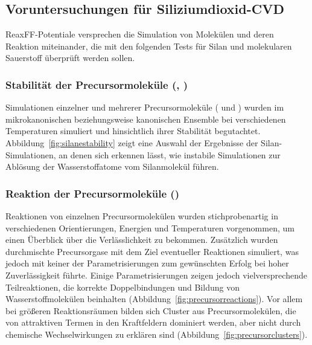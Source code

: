 \subsection{Voruntersuchungen für Siliziumdioxid-CVD}

ReaxFF-Potentiale versprechen die Simulation von Molekülen und deren Reaktion miteinander, die mit den folgenden Tests für Silan und molekularen Sauerstoff überprüft werden sollen.

\subsubsection{Stabilität der Precursormoleküle (, )}

Simulationen einzelner und mehrerer Precursormoleküle ( und ) wurden im mikrokanonischen beziehungsweise kanonischen Ensemble bei verschiedenen Temperaturen simuliert und hinsichtlich ihrer Stabilität begutachtet.
Abbildung~\ref{fig:silanestability} zeigt eine Auswahl der Ergebnisse der Silan-Simulationen, an denen sich erkennen lässt, wie instabile Simulationen zur Ablösung der Wasserstoffatome vom Silanmolekül führen.

\subsubsection{Reaktion der Precursormoleküle ()}

Reaktionen von einzelnen Precursormolekülen wurden stichprobenartig in verschiedenen Orientierungen, Energien und Temperaturen vorgenommen, um einen Überblick über die Verlässlichkeit zu bekommen.
Zusätzlich wurden durchmischte Precursorgase mit dem Ziel eventueller Reaktionen simuliert, was jedoch mit keiner der Parametrisierungen zum gewünschten Erfolg bei hoher Zuverlässigkeit führte.
Einige Parametrisierungen zeigen jedoch vielversprechende Teilreaktionen, die korrekte Doppelbindungen und Bildung von Wasserstoffmolekülen beinhalten (Abbildung~\ref{fig:precursorreactions}).
Vor allem bei größeren Reaktionsräumen bilden sich Cluster aus Precursormolekülen, die von attraktiven Termen in den Kraftfeldern dominiert werden, aber nicht durch chemische Wechselwirkungen zu erklären sind (Abbildung~\ref{fig:precursorclusters}).


